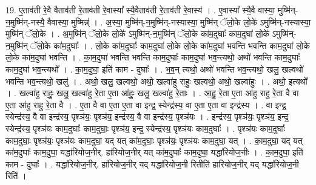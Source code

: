 \documentclass[17pt]{extarticle}
\begin{document}
19. ए॒ताव॑ती रे॒वै वैताव॑ती रे॒ताव॑ती रे॒वास्या᳚ स्यै॒वैताव॑ती रे॒ताव॑ती रे॒वास्य॑ । . ए॒वास्या᳚ स्यै॒वै वास्या॒ मुष्मि॑न्-न॒मुष्मि॑न्-नस्यै॒ वैवास्या॒ मुष्मिन्न्॑ । . अ॒स्या॒ मुष्मि॑न्-न॒मुष्मि॑न्-नस्यास्या॒ मुष्मि॑न् ॅलो॒के लो॒के॑ ऽमुष्मि॑न्-नस्यास्या॒ मुष्मि॑न् ॅलो॒के । . अ॒मुष्मि॑न् ॅलो॒के लो॒के॑ ऽमुष्मि॑न्-न॒मुष्मि॑न् ॅलो॒के का॑म॒दुघाः᳚ काम॒दुघा॑ लो॒के॑ ऽमुष्मि॑न्-न॒मुष्मि॑न् ॅलो॒के का॑म॒दुघाः᳚ । . लो॒के का॑म॒दुघाः᳚ काम॒दुघा॑ लो॒के लो॒के का॑म॒दुघा॑ भवन्ति भवन्ति काम॒दुघा॑ लो॒के लो॒के का॑म॒दुघा॑ भवन्ति । . का॒म॒दुघा॑ भवन्ति भवन्ति काम॒दुघाः᳚ काम॒दुघा॑ भव॒न्त्यथो॒ अथो॑ भवन्ति काम॒दुघाः᳚ काम॒दुघा॑ भव॒न्त्यथो᳚ । . का॒म॒दुघा॒ इति॑ काम - दुघाः᳚ । . भ॒व॒न् त्यथो॒ अथो॑ भवन्ति भव॒न्त्यथो॒ खलु॒ खल्वथो॑ भवन्ति भव॒न्त्यथो॒ खलु॑ । . अथो॒ खलु॒ खल्वथो॒ अथो॒ खल्वा॑हु राहुः॒ खल्वथो॒ अथो॒ खल्वा॑हुः । . अथो॒ इत्यथो᳚ । . खल्वा॑हु राहुः॒ खलु॒ खल्वा॑हु रे॒ता ए॒ता आ॑हुः॒ खलु॒ खल्वा॑हु रे॒ताः । . आ॒हु॒ रे॒ता ए॒ता आ॑हु राहु रे॒ता वै वा ए॒ता आ॑हु राहु रे॒ता वै । . ए॒ता वै वा ए॒ता ए॒ता वा इन्द्र॒ स्येन्द्र॑स्य॒ वा ए॒ता ए॒ता वा इन्द्र॑स्य । . वा इन्द्र॒ स्येन्द्र॑स्य॒ वै वा इन्द्र॑स्य॒ पृश्ञ॑यः॒ पृश्ञ॑य॒ इन्द्र॑स्य॒ वै वा इन्द्र॑स्य॒ पृश्ञ॑यः । . इन्द्र॑स्य॒ पृश्ञ॑यः॒ पृश्ञ॑य॒ इन्द्र॒ स्येन्द्र॑स्य॒ पृश्ञ॑यः काम॒दुघाः᳚ काम॒दुघाः॒ पृश्ञ॑य॒ इन्द्र॒ स्येन्द्र॑स्य॒ पृश्ञ॑यः काम॒दुघाः᳚ । . पृश्ञ॑यः काम॒दुघाः᳚ काम॒दुघाः॒ पृश्ञ॑यः॒ पृश्ञ॑यः काम॒दुघा॒ यद् यत् का॑म॒दुघाः॒ पृश्ञ॑यः॒ पृश्ञ॑यः काम॒दुघा॒ यत् । . का॒म॒दुघा॒ यद् यत् का॑म॒दुघाः᳚ काम॒दुघा॒ यद्धा॑रियोज॒नीर्. हा॑रियोज॒नीर् यत् का॑म॒दुघाः᳚ काम॒दुघा॒ यद्धा॑रियोज॒नीः । . का॒म॒दुघा॒ इति॑ काम - दुघाः᳚ । . यद्धा॑रियोज॒नीर्. हा॑रियोज॒नीर् यद् यद्धा॑रियोज॒नी रितीति॑ हारियोज॒नीर् यद् यद्धा॑रियोज॒नी रिति॑ । \newline
\end{document}
